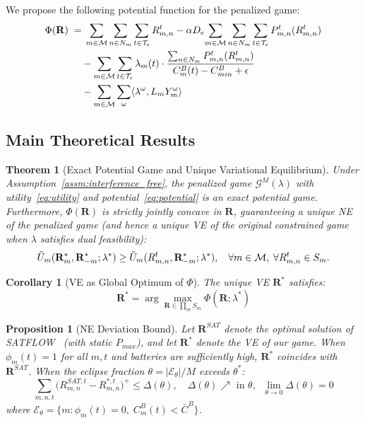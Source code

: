 \documentclass[journal]{IEEEtran}
\newtheorem{theorem}{Theorem}
\newtheorem{proposition}{Proposition}
\newtheorem{corollary}{Corollary}
\newcommand{\CB}{C^{B}}
\newcommand{\CBmin}{C^{B}_{min}}
\newcommand{\Pmax}{P_{max}}
\newcommand{\calM}{\mathcal{M}}
\newcommand{\calG}{\mathcal{G}}
\newcommand{\calT}{\mathcal{T}}
\newcommand{\bfR}{\mathbf{R}}
\newcommand{\Rmn}{R_{m,n}^{t}}
\begin{document}
We propose the following potential function for the penalized game:
\begin{align}
    \small
    \Phi(\bfR) \;=&\;
    \sum_{m\in\calM}\sum_{n\in N_m}
    \sum_{t\in\calT_e} \Rmn
    - \alpha D_e\!
    \sum_{m\in\calM}\sum_{n\in N_m}
    \sum_{t\in\calT_e} P_{m,n}^t(\Rmn)
    \notag\\
    &- \sum_{m\in\calM}\sum_{t\in\calT_e}
    \lambda_m(t)\cdot
    \frac{\sum_{n\in N_m}P_{m,n}^t(\Rmn)}%
    {\CB_m(t)-\CBmin+\epsilon}
    \notag\\
    &- \sum_{m\in\calM}\sum_\omega
    \langle \lambda^\omega, L_m Y_m^\omega \rangle
    \label{eq:potential}
\end{align}

\subsection{Main Theoretical Results}

\begin{theorem}[Exact Potential Game and Unique
Variational Equilibrium]
\label{thm:potential}
Under Assumption~\ref{assm:interference_free}, the penalized game $\calG^M(\lambda)$ with utility~\eqref{eq:utility} and potential~\eqref{eq:potential} is an
\emph{exact potential game}.
Furthermore, $\Phi(\bfR)$ is strictly jointly concave in $\bfR$, guaranteeing a \emph{unique} NE of the penalized game (and hence a unique VE of the original constrained game when $\lambda$ satisfies dual feasibility):
\begin{equation}
    \small
    \tilde{U}_m(\bfR_{m}^*,\bfR_{-m}^*;\lambda^*)
    \geq \tilde{U}_m(R_{m,n}^t,\bfR_{-m}^*;\lambda^*),
    \quad\forall m\in\calM,\;
    \forall R_{m,n}^t\in S_m.
\end{equation}
\end{theorem}


\begin{corollary}[VE as Global Optimum of $\Phi$]
\label{cor:ne_optimal}
The unique VE $\bfR^*$ satisfies:
\begin{equation}
    \bfR^* = \arg\max_{\bfR\in\prod_m S_m}
    \Phi(\bfR;\lambda^*)
\end{equation}
\end{corollary}

\begin{proposition}[NE Deviation Bound]
\label{prop:deviation}
Let $\bfR^{SAT}$ denote the optimal solution of SATFLOW~\cite{cen2024satflow} (with static $\Pmax$), and let $\bfR^*$ denote the VE of our game. When $\phi_m(t)=1$ for all $m,t$ and batteries are sufficiently high, $\bfR^*$ coincides with $\bfR^{SAT}$. When the eclipse fraction $\theta = |\mathcal{E}_\theta|/M$ exceeds $\theta^*$:
\begin{equation}
    \sum_{m,n,t}\!\bigl(
    R_{m,n}^{SAT,t} - R_{m,n}^{*,t}
    \bigr)^+
    \leq \Delta(\theta),
    \quad
    \Delta(\theta)\nearrow \text{ in }\theta,
    \;\;
    \lim_{\theta\to 0}\Delta(\theta)=0
    \label{eq:deviation_bound}
\end{equation}
where $\mathcal{E}_\theta = \{m : \phi_m(t)=0,\;\CB_m(t)<\bar{C}^B\}$.
\end{proposition}
\end{document}
